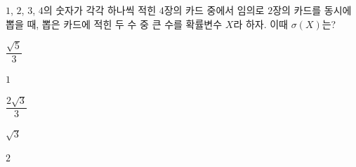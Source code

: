 $1$, $2$, $3$, $4$의 숫자가 각각 하나씩 적힌 $4$장의 카드 중에서 임의로 $2$장의 카드를 동시에 뽑을 때, 뽑은 카드에 적힌 두 수 중 큰 수를 확률변수 $X$라 하자. 이때 $\sigma(X)$는?
\begin{choices32}{\rule[-3ex]{0pt}{8ex}$\dfrac{\sqrt{5}}{3}$}{\rule[-3ex]{0pt}{8ex}$1$}{\rule[-3ex]{0pt}{8ex}$\dfrac{2\sqrt{3}}{3}$}{\rule[-3ex]{0pt}{8ex}$\sqrt{3}$}{\rule[-3ex]{0pt}{8ex}$2$}\end{choices32}
